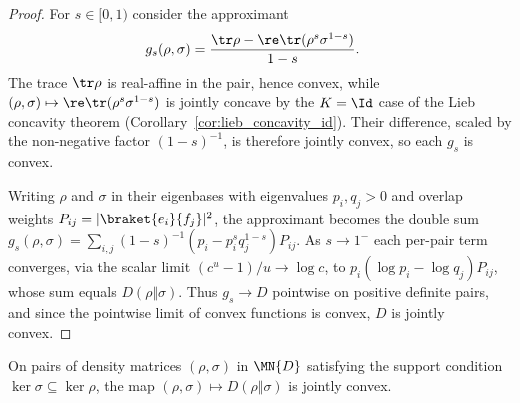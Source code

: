 \begin{proof}\leanok
    For $s\in[0,1)$ consider the approximant
    \begin{align}
        g_s(\rho,\sigma)
         & =\frac{\tr\rho-\re\tr(\rho^s\sigma^{1-s})}{1-s}.
        \label{eq:entropy_convex_approximant}
    \end{align}
    The trace $\tr\rho$ is real-affine in the pair, hence convex,
    while $(\rho,\sigma)\mapsto\re\tr(\rho^s\sigma^{1-s})$ is jointly concave by
    the $K=\Id$ case of the Lieb concavity theorem
    (Corollary~\ref{cor:lieb_concavity_id}). Their difference, scaled by the
    non-negative factor $(1-s)^{-1}$, is therefore jointly convex, so each
    $g_s$ is convex.

    Writing $\rho$ and $\sigma$ in their eigenbases with eigenvalues $p_i,q_j>0$
    and overlap weights $P_{ij}=\lvert\braket{e_i}{f_j}\rvert^2$, the approximant
    becomes the double sum
    $g_s(\rho,\sigma)=\sum_{i,j}(1-s)^{-1}(p_i-p_i^sq_j^{1-s})P_{ij}$. As
    $s\to1^-$ each per-pair term converges, via the scalar limit
    $(c^u-1)/u\to\log c$, to
    $p_i(\log p_i-\log q_j)P_{ij}$, whose sum equals
    $D(\rho\Vert\sigma)$. Thus $g_s\to D$ pointwise on positive definite pairs,
    and since the pointwise limit of convex functions is convex, $D$ is jointly
    convex.
\end{proof}

\begin{theorem}
    \label{thm:relative_entropy_joint_convexity_support}
    \leanok
    On pairs of density matrices $(\rho,\sigma)$ in $\MN{D}$ satisfying the support
    condition $\ker\sigma\subseteq\ker\rho$, the map
    $(\rho,\sigma)\mapsto D(\rho\Vert\sigma)$ is jointly convex.
\end{theorem}

